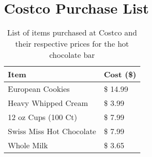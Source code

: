 \section{Costco Purchase List}
\label{appendix:costco}

\begin{table}[H]
	\centering
	\caption{List of items purchased at Costco and their respective prices for the hot chocolate bar}
	\begin{tabular}{l|l}
	\textbf{Item}            & \textbf{Cost (\$)} \\ \hline
	European Cookies         & \$  14.99          \\
	Heavy Whipped Cream      & \$    3.99         \\
	12 oz Cups (100 Ct)      & \$    7.99         \\
	Swiss Miss Hot Chocolate & \$    7.99         \\
	Whole Milk               & \$    3.65
	\end{tabular}
	\label{tab:costco}
\end{table}

